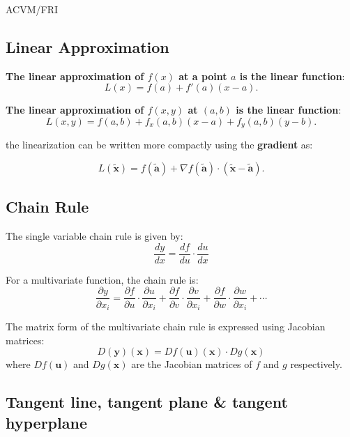 \documentclass{article}
\begin{document}
\begin{center}
	{\small ACVM/FRI \par}
\end{center}

\begin{multicols}{2}

	\section{Linear Approximation}

	\textbf{The linear approximation of \( f(x) \) at a point \( a \) is the linear function}:
	\[
		L(x) = f(a) + f'(a)(x - a).
	\]


	\textbf{The linear approximation of \( f(x, y) \) at \( (a, b) \) is the linear function}:
	\[
		L(x, y) = f(a, b) + f_x(a, b)(x - a) + f_y(a, b)(y - b).
	\]

	the linearization can be written more compactly using the \textbf{gradient} as:

	\[
		L(\mathbf{\tilde{x}}) = f(\mathbf{\tilde{a}}) + \nabla f(\mathbf{\tilde{a}}) \cdot (\mathbf{\tilde{x}} - \mathbf{\tilde{a}}).
	\]

	\subsection{Chain Rule}

	The single variable chain rule is given by:
	\[
		\frac{dy}{dx} = \frac{df}{du} \cdot \frac{du}{dx}
	\]

	For a multivariate function, the chain rule is:
	\[
		\frac{\partial y}{\partial x_i} = \frac{\partial f}{\partial u} \cdot \frac{\partial u}{\partial x_i} + \frac{\partial f}{\partial v} \cdot \frac{\partial v}{\partial x_i} + \frac{\partial f}{\partial w} \cdot \frac{\partial w}{\partial x_i} + \cdots
	\]

	The matrix form of the multivariate chain rule is expressed using Jacobian matrices:
	\[
		D(\mathbf{y})(\mathbf{x}) = Df(\mathbf{u})(\mathbf{x}) \cdot Dg(\mathbf{x})
	\]
	where \( Df(\mathbf{u}) \) and \( Dg(\mathbf{x}) \) are the Jacobian matrices of \( f \) and \( g \) respectively.

	\subsection{Tangent line, tangent plane \& tangent hyperplane}


\end{multicols}
\end{document}
